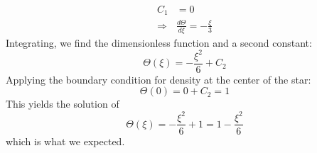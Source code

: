 \documentclass[12pt]{article}
\begin{document}
\begin{adjustwidth}{2.5em}{0pt}
\begin{siderules}
{\begin{equation}
\begin{aligned}
C_1 &= 0 \\
\Rightarrow & \frac{d\Theta}{d\xi} = -\frac{\xi}{3}
\end{aligned}
\end{equation}
Integrating, we find the dimensionless function and a second constant:
\begin{equation}
\Theta(\xi) = -\frac{\xi^2}{6} + C_2
\end{equation}
Applying the boundary condition for density at the center of the star:
\begin{equation*}
\Theta(0) = 0 + C_2 = 1
\end{equation*}
This yields the solution of
\begin{equation}
\Theta(\xi) = -\frac{\xi^2}{6} + 1 = 1 - \frac{\xi^2}{6}
\end{equation}
which is what we expected.
 }
\end{siderules}
\end{adjustwidth}
\end{document}
